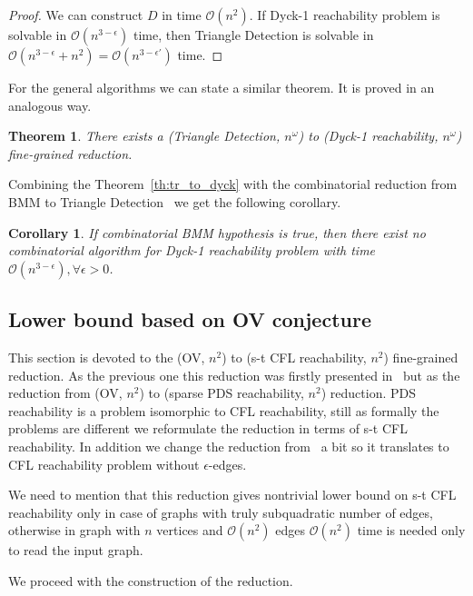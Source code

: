 \documentclass[12pt]{article}
\newtheorem{theorem}{Theorem}[section]
\newtheorem{cor}{Corollary}[section]
\begin{document}
\begin{proof}
We can construct $D$ in time $\mathcal{O}(n^2)$. If Dyck-1 reachability problem is solvable in $\mathcal{O}(n^{3 - \epsilon})$ time, then Triangle Detection is solvable in $\mathcal{O}(n^{3 - \epsilon} + n^2) =\mathcal{O}(n^{3 - \epsilon'})$ time.
\end{proof}

For the general algorithms we can state a similar theorem. It is proved in an analogous way.

\begin{theorem}
There exists a (Triangle Detection, $n^{\omega}$) to (Dyck-1 reachability, $n^{\omega}$) fine-grained reduction.
\end{theorem}

Combining the Theorem~\ref{th:tr_to_dyck} with the combinatorial reduction from BMM to Triangle Detection~\cite{Williams2009TriangleDV} we get the following corollary.

\begin{cor}
If combinatorial BMM hypothesis is true, then there exist no combinatorial algorithm for Dyck-1 reachability problem with time $\mathcal{O}(n^{3 - \epsilon}), \forall \epsilon > 0$.
\end{cor}

\subsection{Lower bound based on OV conjecture}

This section is devoted to the (OV, $n^2$) to (s-t CFL reachability, $n^2$) fine-grained reduction. As the previous one this reduction was firstly presented in~\cite{hansen2021tight} but as the reduction from (OV, $n^2$) to (sparse PDS reachability, $n^2$) reduction. PDS reachability is a problem isomorphic to CFL reachability, still as formally the problems are different we reformulate the reduction in terms of s-t CFL reachability. In addition we change the reduction from~\cite{hansen2021tight} a bit so it translates to CFL reachability problem without $\epsilon$-edges.

We need to mention that this reduction gives nontrivial lower bound on s-t CFL reachability only in case of graphs with truly subquadratic number of edges, otherwise in graph with $n$ vertices and $\mathcal{O}(n^2)$ edges $\mathcal{O}(n^2)$ time is needed only to read the input graph.

We proceed with the construction of the reduction.
\end{document}
